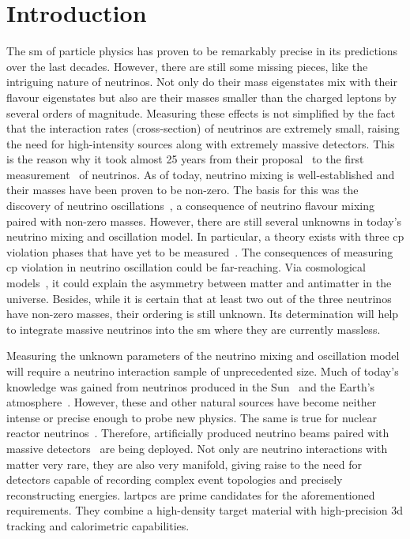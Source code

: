 \chapter{Introduction}
\label{chap:introduction}

The \gls{sm} of particle physics has proven to be remarkably precise in its predictions over the last decades.
However, there are still some missing pieces, like the intriguing nature of neutrinos.
Not only do their mass eigenstates mix with their flavour eigenstates but also are their masses smaller than the charged leptons by several orders of magnitude.
Measuring these effects is not simplified by the fact that the interaction rates (cross-section) of neutrinos are extremely small, raising the need for high-intensity sources along with extremely massive detectors.
This is the reason why it took almost \num{25} years from their proposal~\cite{pauliLetter} to the first measurement~\cite{reinesCowan} of neutrinos.
As of today, neutrino mixing is well-established and their masses have been proven to be non-zero.
The basis for this was the discovery of neutrino oscillations~\cite{superKAtmos1, superKAtmos2, snoSolar}, a consequence of neutrino flavour mixing~\cite{pontecorvo, makiNakagawaSakata} paired with non-zero masses.
However, there are still several unknowns in today's neutrino mixing and oscillation model.
In particular, a theory exists with three \gls{cp} violation phases that have yet to be measured~\cite{pontecorvo, makiNakagawaSakata, mariuana}.
The consequences of measuring \gls{cp} violation in neutrino oscillation could be far-reaching.
Via cosmological models~\cite{pdg}, it could explain the asymmetry between matter and antimatter in the universe.
Besides, while it is certain that at least two out of the three neutrinos have non-zero masses, their ordering is still unknown.
Its determination will help to integrate massive neutrinos into the \gls{sm} where they are currently massless.

Measuring the unknown parameters of the neutrino mixing and oscillation model will require a neutrino interaction sample of unprecedented size.
Much of today's knowledge was gained from neutrinos produced in the Sun~\cite{homestake68, homestake98, snoSolar} and the Earth's atmosphere~\cite{superKAtmos1, superKAtmos2}.
However, these and other natural sources have become neither intense or precise enough to probe new physics.
The same is true for nuclear reactor neutrinos~\cite{reinesCowan, dayabayRecent}.
Therefore, artificially produced neutrino beams paired with massive detectors~\cite{t2kOsc} are being deployed.
Not only are neutrino interactions with matter very rare, they are also very manifold, giving raise to the need for detectors capable of recording complex event topologies and precisely reconstructing energies.
\glspl{lartpc} are prime candidates for the aforementioned requirements.
They combine a high-density target material with high-precision \gls{3d} tracking and calorimetric capabilities.

